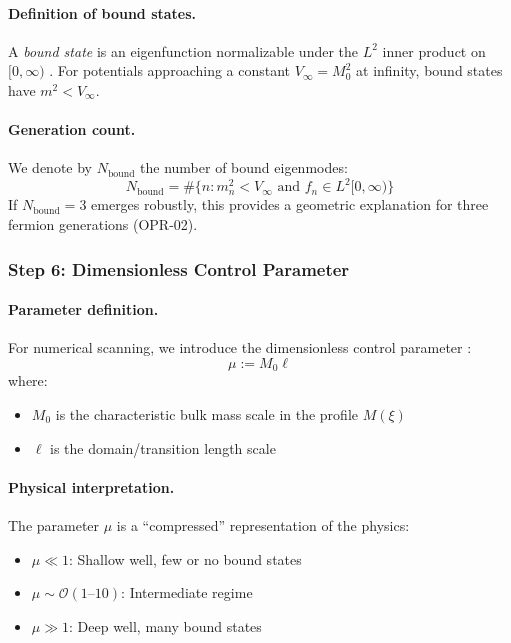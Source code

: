 \paragraph{Definition of bound states.}
A \emph{bound state} is an eigenfunction normalizable under the $L^2$ inner product
on $[0, \infty)$ \tagM{}. For potentials approaching a constant $V_\infty = M_0^2$
at infinity, bound states have $m^2 < V_\infty$.

\paragraph{Generation count.}
We denote by $N_{\text{bound}}$ the number of bound eigenmodes:
\begin{equation}
    N_{\text{bound}} = \#\{n : m_n^2 < V_\infty \text{ and } f_n \in L^2[0,\infty)\}
    \label{eq:opr21:nbound_def}
\end{equation}
If $N_{\text{bound}} = 3$ emerges robustly, this provides a geometric explanation
for three fermion generations (OPR-02).

\subsubsection{Step 6: Dimensionless Control Parameter}
\label{subsubsec:opr21_step6}

\paragraph{Parameter definition.}
For numerical scanning, we introduce the dimensionless control parameter \tagP{}:
\begin{equation}
    \boxed{\mu := M_0 \ell}
    \label{eq:opr21:mu_def}
\end{equation}
where:
\begin{itemize}[nosep]
    \item $M_0$ is the characteristic bulk mass scale in the profile $M(\xi)$
    \item $\ell$ is the domain/transition length scale
\end{itemize}

\paragraph{Physical interpretation.}
The parameter $\mu$ is a ``compressed'' representation of the physics:
\begin{itemize}[nosep]
    \item $\mu \ll 1$: Shallow well, few or no bound states
    \item $\mu \sim \mathcal{O}(1\text{--}10)$: Intermediate regime
    \item $\mu \gg 1$: Deep well, many bound states
\end{itemize}

